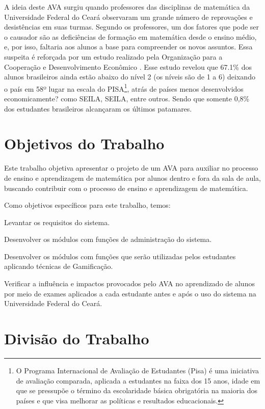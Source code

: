 A ideia deste AVA surgiu quando professores das disciplinas de matemática da Universidade Federal do Cear\'a observaram um grande número de 
reprovações e desistências em suas turmas. Segundo os professores, um dos fatores que pode ser o causador são as deficiências de formação em 
matemática desde o ensino médio, e, por isso, faltaria aos alunos a base para compreender os novos assuntos. Essa suspeita é reforçada por 
um estudo realizado pela Organização para a Cooperação e Desenvolvimento Econômico \cite{pisainfocus2016}. Esse estudo revelou que 67.1\% 
dos alunos brasileiros ainda estão abaixo do nível 2 (os níveis são de 1 a 6) deixando o país em 58º lugar na escala do PISA\footnote{O 
Programa Internacional de Avaliação de Estudantes (Pisa) é uma iniciativa de avaliação comparada, aplicada a estudantes na faixa dos 15 
anos, idade em que se pressupõe o término da escolaridade básica obrigatória na maioria dos países e que visa melhorar as políticas e 
resultados educacionais.}, atr\'as de países menos desenvolvidos {economicamente?} como SEILA, SEILA, entre outros. Sendo 
que somente 0,8\% dos estudantes brasileiros alcançaram os últimos patamares.

\section{Objetivos do Trabalho}

Este trabalho objetiva apresentar o projeto de um AVA para auxiliar no processo de ensino e aprendizagem de matemática por alunos dentro e 
fora da sala de aula, buscando contribuir com o processo de ensino e aprendizagem de matem\'atica. 

Como objetivos específicos para este trabalho, temos: 
\begin{alineas}
  \item Levantar os requisitos do sistema.
  \item Desenvolver os módulos com funções de administração do sistema.
  \item Desenvolver os módulos com funções que serão utilizadas pelos estudantes aplicando técnicas de Gamificação.
  \item Verificar a influência e impactos provocados pelo AVA no aprendizado de alunos por meio de exames aplicados a 
cada estudante antes e após o uso do sistema na Universidade Federal do Ceará.
\end{alineas}


\section{Divisão do Trabalho}

